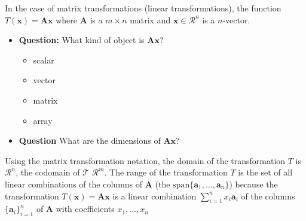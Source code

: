 \documentclass[
]{book}
\providecommand{\tightlist}{%
  \setlength{\itemsep}{0pt}\setlength{\parskip}{0pt}}
\theoremstyle{definition}
\theoremstyle{definition}
\theoremstyle{definition}
\theoremstyle{remark}
\begin{document}
In the case of matrix transformations (linear transformations), the function \(T(\mathbf{x}) = \mathbf{A} \mathbf{x}\) where \(\mathbf{A}\) is a \(m \times n\) matrix and \(\mathbf{x} \in \mathcal{R}^n\) is a \(n\)-vector.

\begin{itemize}
\tightlist
\item
  \textbf{Question:} What kind of object is \(\mathbf{A} \mathbf{x}\)?

  \begin{itemize}
  \tightlist
  \item
    scalar
  \item
    vector
  \item
    matrix
  \item
    array
  \end{itemize}
\item
  \textbf{Question} What are the dimensions of \(\mathbf{A} \mathbf{x}\)?
\end{itemize}

Using the matrix transformation notation, the domain of the transformation \(T\) is \(\mathcal{R}^n\), the codomain of \(\mathcal{T}\) \(\mathcal{R}^m\). The range of the transformation \(T\) is the set of all linear combinations of the columns of \(\mathbf{A}\) (the \(\mbox{span}\{\mathbf{a}_1, \ldots, \mathbf{a}_n\}\)) because the transformation \(T(\mathbf{x}) = \mathbf{A} \mathbf{x}\) is a linear combination \(\sum_{i=1}^n x_i \mathbf{a}_i\) of the columns \(\{\mathbf{a}_i\}_{i=1}^n\) of \(\mathbf{A}\) with coefficients \(x_1, \ldots, x_n\)
\end{document}
